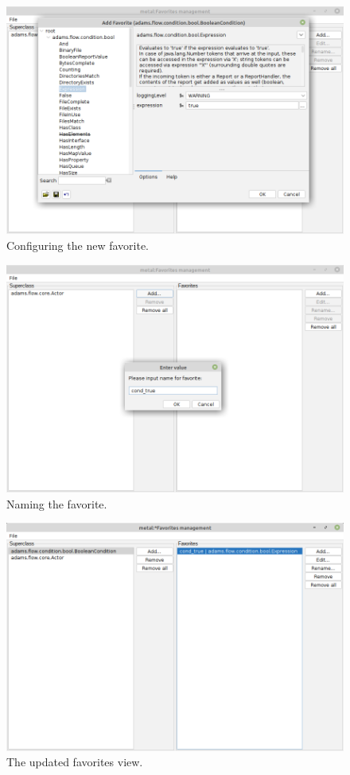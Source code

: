 \begin{figure}[htb]
  \centering
  \includegraphics[width=12.0cm]{images/favoritesmanagement-addsuper2.png}
  \caption{Configuring the new favorite.}
  \label{favoritesmanagement-addsuper2}
\end{figure}

\begin{figure}[htb]
  \centering
  \includegraphics[width=12.0cm]{images/favoritesmanagement-addsuper3.png}
  \caption{Naming the favorite.}
  \label{favoritesmanagement-addsuper3}
\end{figure}

\begin{figure}[htb]
  \centering
  \includegraphics[width=12.0cm]{images/favoritesmanagement-addsuper4.png}
  \caption{The updated favorites view.}
  \label{favoritesmanagement-addsuper4}
\end{figure}

